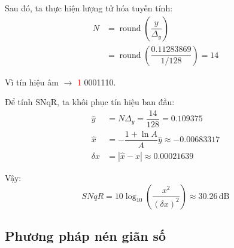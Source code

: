 Sau đó, ta thực hiện lượng tử hóa tuyến tính:
\[
    \begin{aligned}
        N &= \operatorname{round}\left(\dfrac{y}{\Delta_y}\right)\\[6pt]
          &= \operatorname{round}\left(\dfrac{0.11283869}{1/128}\right) = 14
    \end{aligned}
\]

Vì tín hiệu âm $\rightarrow$ \textcolor{red}{1} 0001110.

Để tính SNqR, ta khôi phục tín hiệu ban đầu:
\[
    \begin{aligned}
        \hat{y} &= N\Delta_y = \dfrac{14}{128} = 0.109375\\[6pt]
        \hat{x} &= -\dfrac{1 + \ln A}{A}\hat{y} \approx -0.00683317\\[6pt]
        \delta x &= |\hat{x} - x| \approx 0.00021639
    \end{aligned}
\]

Vậy:
\[
    SNqR = 10\log_{10}\left(\dfrac{x^2}{(\delta x)^2}\right)
        \approx 30.26\,\mathrm{dB}
\]

\subsection{Phương pháp nén giãn số}
\begin{center}
    
\end{center}